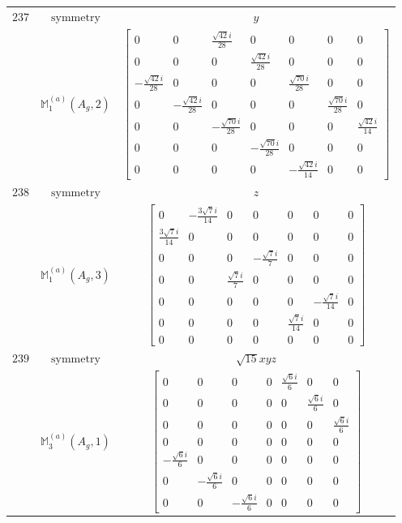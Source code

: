 \documentclass[fleqn,8pt,landscape]{jsarticle}
\begin{document}
\begin{longtable}{ccc}
$ 237 $ & $ \text{symmetry} $ & $ y $ \\
$  $ & $ \mathbb{M}_{1}^{(a)}(A_{g},2) $ & $ \begin{bmatrix} 0 & 0 & \frac{\sqrt{42} i}{28} & 0 & 0 & 0 & 0 \\ 0 & 0 & 0 & \frac{\sqrt{42} i}{28} & 0 & 0 & 0 \\ - \frac{\sqrt{42} i}{28} & 0 & 0 & 0 & \frac{\sqrt{70} i}{28} & 0 & 0 \\ 0 & - \frac{\sqrt{42} i}{28} & 0 & 0 & 0 & \frac{\sqrt{70} i}{28} & 0 \\ 0 & 0 & - \frac{\sqrt{70} i}{28} & 0 & 0 & 0 & \frac{\sqrt{42} i}{14} \\ 0 & 0 & 0 & - \frac{\sqrt{70} i}{28} & 0 & 0 & 0 \\ 0 & 0 & 0 & 0 & - \frac{\sqrt{42} i}{14} & 0 & 0 \end{bmatrix} $ \\ \hline
$ 238 $ & $ \text{symmetry} $ & $ z $ \\
$  $ & $ \mathbb{M}_{1}^{(a)}(A_{g},3) $ & $ \begin{bmatrix} 0 & - \frac{3 \sqrt{7} i}{14} & 0 & 0 & 0 & 0 & 0 \\ \frac{3 \sqrt{7} i}{14} & 0 & 0 & 0 & 0 & 0 & 0 \\ 0 & 0 & 0 & - \frac{\sqrt{7} i}{7} & 0 & 0 & 0 \\ 0 & 0 & \frac{\sqrt{7} i}{7} & 0 & 0 & 0 & 0 \\ 0 & 0 & 0 & 0 & 0 & - \frac{\sqrt{7} i}{14} & 0 \\ 0 & 0 & 0 & 0 & \frac{\sqrt{7} i}{14} & 0 & 0 \\ 0 & 0 & 0 & 0 & 0 & 0 & 0 \end{bmatrix} $ \\ \hline
$ 239 $ & $ \text{symmetry} $ & $ \sqrt{15} x y z $ \\
$  $ & $ \mathbb{M}_{3}^{(a)}(A_{g},1) $ & $ \begin{bmatrix} 0 & 0 & 0 & 0 & \frac{\sqrt{6} i}{6} & 0 & 0 \\ 0 & 0 & 0 & 0 & 0 & \frac{\sqrt{6} i}{6} & 0 \\ 0 & 0 & 0 & 0 & 0 & 0 & \frac{\sqrt{6} i}{6} \\ 0 & 0 & 0 & 0 & 0 & 0 & 0 \\ - \frac{\sqrt{6} i}{6} & 0 & 0 & 0 & 0 & 0 & 0 \\ 0 & - \frac{\sqrt{6} i}{6} & 0 & 0 & 0 & 0 & 0 \\ 0 & 0 & - \frac{\sqrt{6} i}{6} & 0 & 0 & 0 & 0 \end{bmatrix} $ \\ \hline

\end{longtable}
\end{document}
